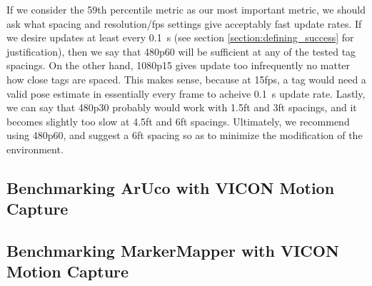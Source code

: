 \documentclass{article}
\begin{document}
    If we consider the 59th percentile metric as our most important metric, we should ask what spacing and resolution/fps settings give acceptably fast update rates. If we desire updates at least every \SI{0.1}{\second} (see section \ref{section:defining_success} for justification), then we say that 480p60 will be sufficient at any of the tested tag spacings. On the other hand, 1080p15 gives update too infrequently no matter how close tags are spaced. This makes sense, because at 15fps, a tag would need a valid pose estimate in essentially every frame to acheive \SI{0.1}{\second} update rate. Lastly, we can say that 480p30 probably would work with 1.5ft and 3ft spacings, and it becomes slightly too slow at 4.5ft and 6ft spacings. Ultimately, we recommend using 480p60, and suggest a 6ft spacing so as to minimize the modification of the environment.


	\subsection{Benchmarking ArUco with VICON Motion Capture}

	\subsection{Benchmarking MarkerMapper with VICON Motion Capture}
\end{document}
